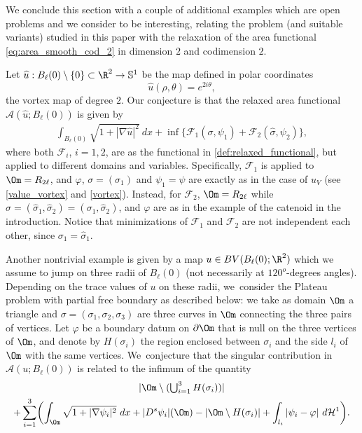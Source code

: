 We conclude this section with a couple of additional
examples which are open problems and we consider to be interesting, relating the problem
(and suitable variants) studied in this paper with the relaxation
of the area functional \eqref{eq:area_smooth_cod_2}
in dimension $2$ and codimension $2$.

Let $\widehat u:B_\ell(0)\setminus\{0\}\subset\R^2\to \mathbb S^1$ be the map defined in polar coordinates
\[
\widehat u(\rho,\theta)=e^{2i\theta},
\]
\ie the vortex map of degree $2$. Our conjecture is
that the relaxed area functional $\mathcal A(\widehat u;B_\ell(0)) $ is given by
\begin{align}\label{value_vortex2}
\int_{B_\ell(0)}\sqrt{1+|\nabla \widehat u|^2}~dx+\inf\{\mathcal F_1(\sigma,\psi_1)+\mathcal F_2(\widehat \sigma,\psi_2)\},
\end{align}
where both $\mathcal F_i$, $i=1,2$, are as the functional in \eqref{def:relaxed_functional}, but applied to different domains and variables. Specifically, $\mathcal F_1$ is applied to $\Om=R_{2\ell}$, and $\varphi$, $\sigma=(\sigma_1)$ and $\psi_1=\psi$ are exactly as in the case of $u_V$ (see \eqref{value_vortex} and \eqref{vortex}). Instead, for $\mathcal F_2$, $\Om=R_{2\ell}$ while $\widehat \sigma=(\widehat \sigma_1,\widehat\sigma_2)=( \sigma_1,\widehat\sigma_2)$, and $\varphi$ are as in the example of the catenoid in the introduction. Notice that minimizations of $\mathcal F_1$ and $\mathcal F_2$ are not independent each other, since $\sigma_1=\widehat \sigma_1$.

Another nontrivial example is given by a map $u\in BV(B_\ell(0);\R^2)$ which we assume to jump on three radii of $ B_\ell(0)$ (not necessarily
at $120^o$-degrees angles). Depending on the trace values of $u$ on these radii, we~consider the Plateau problem with partial free boundary as described below: we take as domain $\Om$ a triangle and $\sigma=(\sigma_1,\sigma_2,\sigma_3)$ are three curves in $\Om$ connecting the three pairs of vertices. Let $\varphi$ be a boundary datum on $\partial \Om$ that is null on the three vertices of $\Om$, and denote by $H(\sigma_i)$ the region enclosed between $\sigma_i$ and the side $l_i$ of $\Om$ with the same vertices. We~conjecture that the singular contribution in $\mathcal A(u;B_\ell(0))$ is related to the infimum of the quantity
\begin{multline*}\textstyle
|\Om\setminus (\bigcup_{i=1}^3H(\sigma_i))|\\
+ \sum_{i=1}^3\biggl(\int_\Om\sqrt{1+|\nabla\psi_i|^2}~dx+|D^s\psi_i|(\Om)-|\Om\setminus H(\sigma_i)|+\int_{l_i}|\psi_i-\varphi|~d\mathcal H^1\biggr).
\end{multline*}

